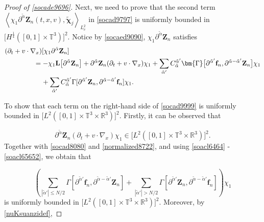 \documentclass[reqno]{amsart}
\numberwithin{equation}{section}
\numberwithin{equation}{section}
\begin{document}
\begin{proof}[Proof of \eqref{socade9696}]
		Next, we need to prove that the second term $\left\langle \chi_{1}\partial^{\tilde{\alpha}} \mathbf{Z}_{n}(t, x, v), \tilde{\bm{\chi}}_j \right\rangle_{L^{2}_{v}}$ in \eqref{socad9797} is uniformly bounded in $\big[H^{\frac{1}{4}}([0, 1] \times \mathbb{T}^{3})\big]^2$. Notice by \eqref{socaed9090}, $\chi_{1}\partial^{\tilde{\alpha}} \mathbf{Z}_{n}$ satisfies
		\begin{align}
			&(\partial_{t} + v \cdot \nabla_{x})[\chi_{1}\partial^{\tilde{\alpha}} \mathbf{Z}_{n}] \notag\\
			&\hspace{1.5cm}= -\chi_{1} \mathbf{L}\big[\partial^{\tilde{\alpha}} \mathbf{Z}_{n}\big] + \partial^{\tilde{\alpha}} \mathbf{Z}_{n} (\partial_{t} + v \cdot \nabla_{x})\chi_{1} + \sum_{\tilde{\alpha}'} C_{\tilde{\alpha}}^{\tilde{\alpha}'} \bm{\Gamma}\big[\partial^{\tilde{\alpha}'} \mathbf{f}_{n}, \partial^{\tilde{\alpha} - \tilde{\alpha}'} \mathbf{Z}_{n}\big]\chi_{1} \notag\\
			&\hspace{1.9cm} + \sum_{\tilde{\alpha}'} C_{\tilde{\alpha}}^{\tilde{\alpha}'} \Gamma[\partial^{\tilde{\alpha}'} \mathbf{Z}_{n}, \partial^{\tilde{\alpha} - \tilde{\alpha}'} \mathbf{f}_{n}]\chi_{1}. \label{socad9999}
		\end{align}
		
		To show that each term on the right-hand side of \eqref{socad9999} is uniformly bounded in $ \big[L^2([0,1] \times \mathbb{T}^3 \times \mathbb{R}^3)\big]^2 $. Firstly, it can be  observed that
		
		$$
		\partial^{\tilde{\alpha}} \mathbf{Z}_n (\partial_t + v \cdot \nabla_x) \chi_1 \in \big[L^2([0,1] \times \mathbb{T}^3 \times \mathbb{R}^3)\big]^2.
		$$
		 Together with \eqref{socad8080} and \eqref{normalized8722}, and using \eqref{soacl6464} - \eqref{soacl65652}, we obtain that
		
		$$
		\left( \sum_{|\tilde{\alpha}'| \leq N/2} \Gamma[\partial^{\tilde{\alpha}'} \mathbf{f}_n, \partial^{\tilde{\alpha} - \tilde{\alpha}'} \mathbf{Z}_n] + \sum_{|\tilde{\alpha}'| > N/2} \Gamma[\partial^{\tilde{\alpha}'} \mathbf{Z}_n, \partial^{\tilde{\alpha} - \tilde{\alpha}'} \mathbf{f}_n] \right) \chi_1
		$$
		is uniformly bounded in $ \big[L^2([0,1] \times \mathbb{T}^3 \times \mathbb{R}^3)\big]^2 $. Moreover, by \eqref{nuKsuanzidef},


\end{proof}
\end{document}
